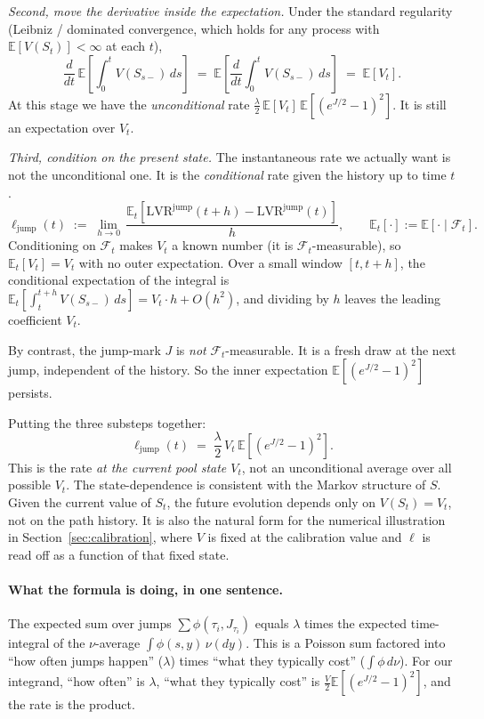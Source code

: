 \documentclass[11pt]{article}
\theoremstyle{definition}
\theoremstyle{remark}
\newcommand{\E}{\mathbb{E}}
\newcommand{\1}{\mathbf{1}}
\begin{document}
\emph{Second, move the derivative inside the expectation.} Under the standard regularity (Leibniz / dominated convergence, which holds for any process with $\E[V(S_t)] < \infty$ at each $t$),
\[
\frac{d}{dt}\,\E\!\left[\int_0^t V(S_{s-})\,ds\right] \;=\; \E\!\left[\frac{d}{dt}\int_0^t V(S_{s-})\,ds\right] \;=\; \E[V_t].
\]
At this stage we have the \emph{unconditional} rate $\frac{\lambda}{2}\,\E[V_t]\,\E[(e^{J/2}-1)^2]$. It is still an expectation over $V_t$.

\emph{Third, condition on the present state.} The instantaneous rate we actually want is not the unconditional one. It is the \emph{conditional} rate given the history up to time $t$.
\[
\ell_{\text{jump}}(t) \;:=\; \lim_{h \to 0}\,\frac{\E_t[\mathrm{LVR}^{\text{jump}}(t+h) - \mathrm{LVR}^{\text{jump}}(t)]}{h}, \qquad \E_t[\cdot] := \E[\cdot \mid \mathcal{F}_t].
\]
Conditioning on $\mathcal{F}_t$ makes $V_t$ a known number (it is $\mathcal{F}_t$-measurable), so $\E_t[V_t] = V_t$ with no outer expectation. Over a small window $[t, t+h]$, the conditional expectation of the integral is $\E_t[\int_t^{t+h} V(S_{s-})\,ds] = V_t \cdot h + O(h^2)$, and dividing by $h$ leaves the leading coefficient $V_t$.

By contrast, the jump-mark $J$ is \emph{not} $\mathcal{F}_t$-measurable. It is a fresh draw at the next jump, independent of the history. So the inner expectation $\E[(e^{J/2}-1)^2]$ persists.

Putting the three substeps together:
\begin{equation}\label{eq:jump-rate}
\ell_{\text{jump}}(t) \;=\; \frac{\lambda}{2}\,V_t\,\E\!\left[(e^{J/2} - 1)^2\right].
\end{equation}
This is the rate \emph{at the current pool state $V_t$}, not an unconditional average over all possible $V_t$. The state-dependence is consistent with the Markov structure of $S$. Given the current value of $S_t$, the future evolution depends only on $V(S_t) = V_t$, not on the path history. It is also the natural form for the numerical illustration in Section~\ref{sec:calibration}, where $V$ is fixed at the calibration value and $\ell$ is read off as a function of that fixed state.

\paragraph{What the formula is doing, in one sentence.}
The expected sum over jumps $\sum \phi(\tau_i, J_{\tau_i})$ equals $\lambda$ times the expected time-integral of the $\nu$-average $\int \phi(s, y)\,\nu(dy)$. This is a Poisson sum factored into ``how often jumps happen'' ($\lambda$) times ``what they typically cost'' ($\int \phi\,d\nu$). For our integrand, ``how often'' is $\lambda$, ``what they typically cost'' is $\frac{V}{2}\E[(e^{J/2}-1)^2]$, and the rate is the product.
\end{document}
